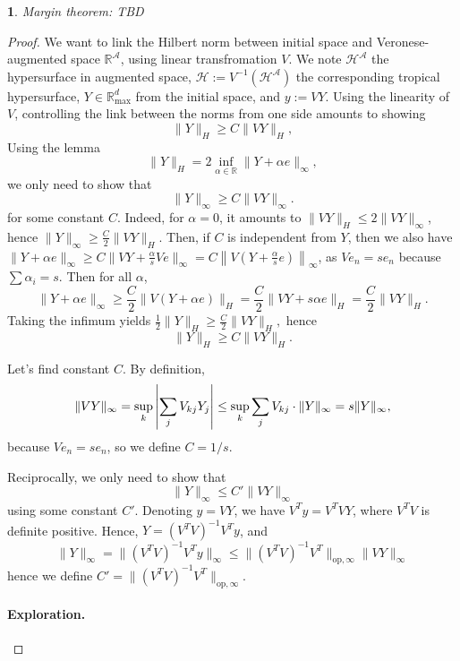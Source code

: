\documentclass[oneside,english,a4paper]{amsart}
\numberwithin{equation}{section}
\numberwithin{figure}{section}
\theoremstyle{plain}
\theoremstyle{definition}
\theoremstyle{plain}
\newtheorem{prop}[thm]{\protect\propositionname}
\theoremstyle{remark}
\theoremstyle{plain}
\theoremstyle{definition}
\theoremstyle{definition}
\providecommand{\propositionname}{Proposition}
\begin{document}
\begin{prop}
Margin theorem: TBD
\end{prop}
\begin{proof}
We want to link the Hilbert norm between initial space and Veronese-augmented
space $\mathbb{R}^{\mathcal{A}}$, using linear transfromation $V$.
We note $\mathcal{H}^{\mathcal{A}}$ the hypersurface in augmented
space, $\mathcal{H}:=V^{-1}(\mathcal{H}^{\mathcal{A}})$ the corresponding
tropical hypersurface, $Y\in\mathbb{R}_{\max}^{d}$ from the initial
space, and $y:=VY$. Using the linearity of $V$, controlling the
link between the norms from one side amounts to showing 
\[
\lVert Y\rVert_{H}\ge C\lVert VY\rVert_{H},
\]
Using the lemma 
\[
\lVert Y\rVert_{H}=2\inf_{\alpha\in\mathbb{R}}\lVert Y+\alpha e\rVert_{\infty},
\]
we only need to show that 
\[
\lVert Y\rVert_{\infty}\ge C\lVert VY\rVert_{\infty}.
\]
for some constant $C$. Indeed, for $\alpha=0$, it amounts to $\lVert VY\rVert_{H}\le2\lVert VY\rVert_{\infty}$,
hence $\lVert Y\rVert_{\infty}\ge\frac{C}{2}\lVert VY\rVert_{H}$.
Then, if $C$ is independent from $Y$, then we also have $\lVert Y+\alpha e\rVert_{\infty}\ge C\lVert VY+\frac{\alpha}{s}Ve\rVert_{\infty}=C\left\lVert V\left(Y+\frac{\alpha}{s}e\right)\right\rVert_{\infty}$,
as $Ve_{n}=se_{n}$ because $\sum\alpha_{i}=s$. Then for all $\alpha$,
\[
\lVert Y+\alpha e\rVert_{\infty}\ge\frac{C}{2}\lVert V(Y+\alpha e)\rVert_{H}=\frac{C}{2}\lVert VY+s\alpha e\lVert_{H}=\frac{C}{2}\lVert VY\lVert_{H}.
\]
Taking the infimum yields $\frac{1}{2}\lVert Y\rVert_{H}\ge\frac{C}{2}\lVert VY\rVert_{H},$
hence
\[
\lVert Y\rVert_{H}\ge C\lVert VY\rVert_{H}.
\]

Let's find constant $C$. By definition,
\[
\lVert VY\rVert_{\infty} =\sup_{k}\left|\sum_{j}V_{kj}Y_{j}\right|
 \le\sup_{k}\sum_{j}V_{kj}\cdot\lVert Y\rVert_{\infty}\\
 =s\lVert Y\rVert_{\infty},
\]
because $Ve_{n}=se_{n}$, so we define $C=1/s$.

Reciprocally, we only need to show that 
\[
\lVert Y\rVert_{\infty}\le C'\lVert VY\rVert_{\infty}
\]
using some constant $C'$. Denoting $y=VY$, we have $V^{T}y=V^{T}VY$,
where $V^{T}V$ is definite positive. Hence, $Y=(V^{T}V)^{-1}V^{T}y$,
and
\[
\lVert Y\rVert_{\infty}=\lVert(V^{T}V)^{-1}V^{T}y\rVert_{\infty}\le\lVert(V^{T}V)^{-1}V^{T}\rVert_{\text{op},\infty}\lVert VY\rVert_{\infty}
\]
hence we define $C'=\lVert(V^{T}V)^{-1}V^{T}\rVert_{\text{op},\infty}$.

\paragraph{Exploration.}


\end{proof}
\end{document}
